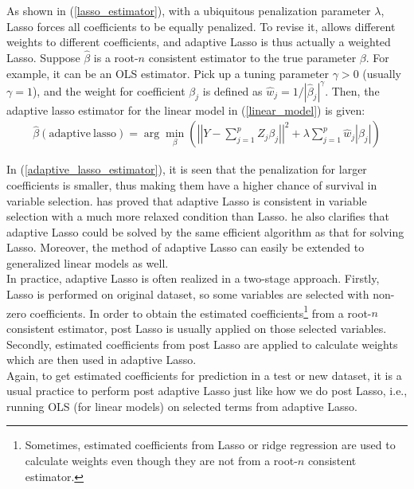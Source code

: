 \documentclass[12pt, a4paper]{article}
\theoremstyle{MAstyle} \newtheorem{assumption}{Assumption}[section]
\theoremstyle{MAstyle} \newtheorem{definition}{Definition}[section]
\theoremstyle{MAstyle} \newtheorem{theorem}{Theorem}[section]
\theoremstyle{MAstyle} \newtheorem{corollary}{Corollary}[section]
\begin{document}
        As shown in (\ref{lasso_estimator}), with a ubiquitous penalization parameter $\lambda$, Lasso forces all coefficients to be equally penalized. To revise it, \cite{Zou_2006} allows different weights to different coefficients, and adaptive Lasso is thus actually a weighted Lasso. Suppose $\hat{\beta}$ is a root-$n$ consistent estimator to the true parameter $\beta$. For example, it can be an OLS estimator. Pick up a tuning parameter $\gamma > 0$ (usually $\gamma=1$), and the weight for coefficient $\beta_j$ is defined as $\hat{w}_j=1/|\hat{\beta}_j|^{\gamma}$. Then, the adaptive lasso estimator for the linear model in (\ref{linear_model}) is given:
        \begin{align}\label{adaptive_lasso_estimator}
            \hat{\beta}(\mathrm{adaptive}\: \mathrm{lasso})=\arg\min\limits_{\beta} \left(\left|\left|Y-\sum\limits_{j=1}^p Z_j\beta_j\right|\right|^2+\lambda\sum\limits_{j=1}^p\hat{w}_j\left|\beta_j\right| \right)
        \end{align}

        In (\ref{adaptive_lasso_estimator}), it is seen that the penalization for larger coefficients is smaller, thus making them have a higher chance of survival in variable selection. \cite{Zou_2006} has proved that adaptive Lasso is consistent in variable selection with a much more relaxed condition than Lasso. he also clarifies that adaptive Lasso could be solved by the same efficient algorithm as that for solving Lasso. Moreover, the method of adaptive Lasso can easily be extended to generalized linear models as well.\\

        In practice, adaptive Lasso is often realized in a two-stage approach. Firstly, Lasso is performed on original dataset, so some variables are selected with non-zero coefficients. In order to obtain the estimated coefficients\footnote{Sometimes, estimated coefficients from Lasso or ridge regression are used to calculate weights even though they are not from a root-$n$ consistent estimator.} from a root-$n$ consistent estimator, post Lasso is usually applied on those selected variables. Secondly, estimated coefficients from post Lasso are applied to calculate weights which are then used in adaptive Lasso. \\

        Again, to get estimated coefficients for prediction in a test or new dataset, it is a usual practice to perform post adaptive Lasso just like how we do post Lasso, i.e., running OLS (for linear models) on selected terms from adaptive Lasso. 
\end{document}
